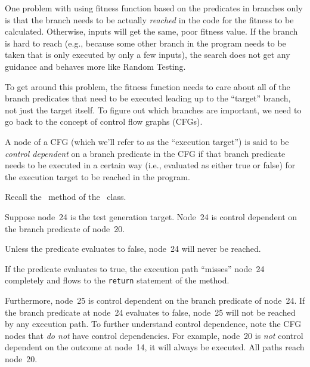 One problem with using fitness function based on the predicates in branches only
is that the branch needs to be actually {\it reached} in the code for the
fitness to be calculated. Otherwise, inputs will get the same, poor fitness
value. If the branch is hard to reach (e.g., because some other branch in the
program needs to be taken that is only executed by only a few inputs), the
search does not get any guidance and behaves more like Random Testing.

To get around this problem, the fitness function needs to care about all of the
branch predicates that need to be executed leading up to the ``target'' branch,
not just the target itself. To figure out which branches are important, we need
to go back to the concept of control flow graphs (CFGs). 


A node of a CFG (which we'll refer to as the ``execution target'') is said to be
{\it control dependent} on a branch predicate in the CFG if that branch
predicate needs to be executed in a certain way (i.e., evaluated as either true
or false) for the execution target to be reached in the program. 

Recall the \classifymethod~method of the \triangleclass~class. 


Suppose node~24 is the test generation target. Node~24 is control dependent on
the branch predicate of node~20. 


Unless the predicate evaluates to false, node~24 will never be reached. 


If the predicate evaluates to true, the execution path ``misses'' node~24
completely and flows to the {\tt return} statement of the method.



Furthermore, node~25 is control dependent on the branch predicate of node~24. If
the branch predicate at node~24 evaluates to false, node~25 will not be reached
by any execution path. To further understand control dependence, note the CFG
nodes that {\it do not} have control dependencies. For example, node~20 is {\it
not} control dependent on the outcome at node~14, it will always be executed.
All paths reach node~20. 

